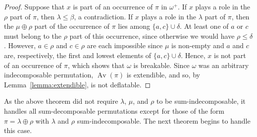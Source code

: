\documentclass[10pt]{article}
\theoremstyle{plain}
\newcommand{\Av}{\operatorname{Av}}
\begin{document}
\begin{proof}
Suppose that $x$ is part of an occurrence of $\pi$ in $\omega^+$. If $x$ plays a role in the $\rho$ part of $\pi$, then $\lambda \leq \beta$, a contradiction. If $x$ plays a role in the $\lambda$ part of $\pi$, then the $\mu \oplus \rho$ part of the occurrence of $\pi$ lies among $\{a,c\} \cup \delta$. At least one of $a$ or $c$ must belong to the $\rho$ part of this occurrence, since otherwise we would have $\rho \leq \delta$. However, $a \in \rho$ and $c \in \rho$ are each impossible since $\mu$ is non-empty and $a$ and $c$ are, respectively, the first and lowest elements of $\{a,c\} \cup \delta$. Hence, $x$ is not part of an occurrence of $\pi$, which shows that $\omega$ is breakable. Since $\omega$ was an arbitrary indecomposable permutation, $\Av(\pi)$ is extendible, and so, by Lemma~\ref{lemma:extendible}, is not deflatable.
\end{proof}

As the above theorem did not require $\lambda$, $\mu$, and $\rho$ to be sum-indecomposable, it handles all sum-decomposable permutations except for those of the form $\pi = \lambda \oplus \rho$ with $\lambda$ and $\rho$ sum-indecomposable. The next theorem begins to handle this case.
\end{document}
